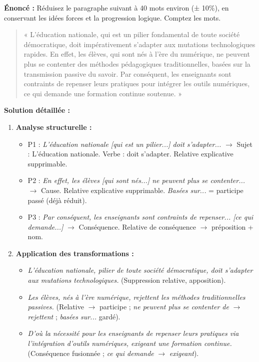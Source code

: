 \documentclass[11pt]{article}
\begin{document}
\begin{exoresolu}
\textbf{Énoncé :} Réduisez le paragraphe suivant à 40 mots environ (± 10\%), en conservant les idées forces et la progression logique. Comptez les mots.
\begin{quote}
« L'éducation nationale, qui est un pilier fondamental de toute société démocratique, doit impérativement s'adapter aux mutations technologiques rapides. En effet, les élèves, qui sont nés à l'ère du numérique, ne peuvent plus se contenter des méthodes pédagogiques traditionnelles, basées sur la transmission passive du savoir. Par conséquent, les enseignants sont contraints de repenser leurs pratiques pour intégrer les outils numériques, ce qui demande une formation continue soutenue. »
\end{quote}
\tcblower
\textbf{Solution détaillée :}
\begin{enumerate}
    \item \textbf{Analyse structurelle :}
    \begin{itemize}
        \item P1 : \emph{L'éducation nationale [qui est un pilier...] doit s'adapter...} $\rightarrow$ Sujet : L'éducation nationale. Verbe : doit s'adapter. Relative explicative supprimable.
        \item P2 : \emph{En effet, les élèves [qui sont nés...] ne peuvent plus se contenter...} $\rightarrow$ Cause. Relative explicative supprimable. \emph{Basées sur...} = participe passé (déjà réduit).
        \item P3 : \emph{Par conséquent, les enseignants sont contraints de repenser... [ce qui demande...]} $\rightarrow$ Conséquence. Relative de conséquence $\rightarrow$ préposition + nom.
    \end{itemize}
    \item \textbf{Application des transformations :}
    \begin{itemize}
        \item \emph{L'éducation nationale, pilier de toute société démocratique, doit s'adapter aux mutations technologiques.} (Suppression relative, apposition).
        \item \emph{Les élèves, nés à l'ère numérique, rejettent les méthodes traditionnelles passives.} (Relative $\rightarrow$ participe ; \emph{ne peuvent plus se contenter de} $\rightarrow$ \emph{rejettent} ; \emph{basées sur...} gardé).
        \item \emph{D'où la nécessité pour les enseignants de repenser leurs pratiques via l'intégration d'outils numériques, exigeant une formation continue.} (Conséquence fusionnée ; \emph{ce qui demande} $\rightarrow$ \emph{exigeant}).

\end{itemize}
\end{enumerate}
\end{exoresolu}
\end{document}
